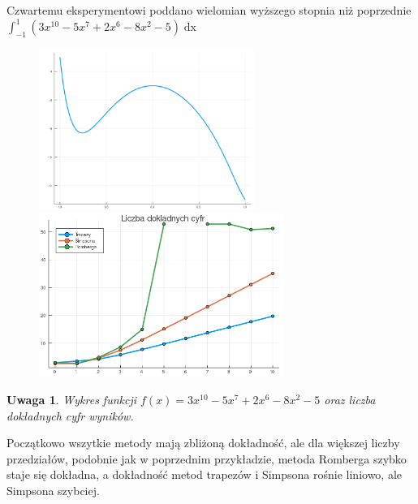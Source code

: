 \documentclass[11pt,wide]{article}
\newtheorem{remark}{Uwaga}
\begin{document}
Czwartemu eksperymentowi poddano wielomian wyższego stopnia niż poprzednie \\ \(\displaystyle \int_{-1}^{1} (3x^{10} - 5x^7 + 2x^6 - 8x^2 - 5)\mathop{dx} \)
\begin{figure}[h!]
	\includegraphics[width=70mm,scale=0.5]{wiel5}
	\includegraphics[width=80mm,scale=0.5]{wiel_blad5}
\end{figure}
\begin{remark}
\centering
Wykres funkcji \(f(x) = 3x^{10} - 5x^7 + 2x^6 - 8x^2 - 5 \) oraz liczba dokładnych cyfr wyników.
\end{remark}
Początkowo wszytkie metody mają zbliżoną dokładność, ale dla większej liczby przedziałów, podobnie jak w poprzednim przykładzie, metoda Romberga szybko staje się dokładna, a dokładność metod trapezów i Simpsona rośnie liniowo, ale Simpsona szybciej. \\ \\
\end{document}
